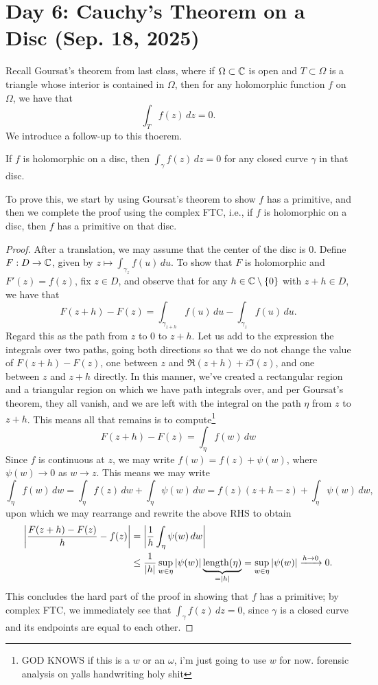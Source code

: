 \section{Day 6: Cauchy's Theorem on a Disc (Sep. 18, 2025)}
Recall Goursat's theorem from last class, where if $\Omega \subset \mathbb C$ is open and $T \subset \Omega$ is a triangle whose interior is contained in $\Omega$, then for any holomorphic function $f$ on $\Omega$, we have that
\[ \int_T f(z) \, dz = 0. \]
We introduce a follow-up to this thoerem.
\begin{theorem}
    If $f$ is holomorphic on a disc, then $\int_\gamma f(z) \, dz = 0$ for any closed curve $\gamma$ in that disc.
\end{theorem}
\noindent To prove this, we start by using Goursat's theorem to show $f$ has a primitive, and then we complete the proof using the complex FTC, i.e., if $f$ is holomorphic on a disc, then $f$ has a primitive on that disc.
\begin{proof}
    After a translation, we may assume that the center of the disc is $0$. Define $F : D \to \mathbb C$, given by $z \mapsto \int_{\gamma_z} f(u) \, du$. To show that $F$ is holomorphic and $F'(z) = f(z)$, fix $z \in D$, and observe that for any $h \in \mathbb C \setminus \{0\}$ with $z + h \in D$, we have that
    \[ F(z+h) - F(z) = \int_{\gamma_{z+h}} f(u) \, du - \int_{\gamma_z} f(u) \, du. \]
    Regard this as the path from $z$ to $0$ to $z+h$. Let us add to the expression the integrals over two paths, going both directions so that we do not change the value of $F(z+h) - F(z)$, one between $z$ and $\Re(z+h) + i \Im(z)$, and one between $z$ and $z+h$ directly. In this manner, we've created a rectangular region and a triangular region on which we have path integrals over, and per Goursat's theorem, they all vanish, and we are left with the integral on the path $\eta$ from $z$ to $z+h$. This means all that remains is to compute\footnote{GOD KNOWS if this is a $w$ or an $\omega$, i'm just going to use $w$ for now. forensic analysis on yalls handwriting holy shit}
    \[ F(z + h) - F(z) = \int_{\eta} f(w) \, dw \]
    Since $f$ is continuous at $z$, we may write $f(w) = f(z) + \psi(w)$, where $\psi(w) \to 0$ as $w \to z$. This means we may write
    \[ \int_\eta f(w) \, dw = \int_\eta f(z) \, dw + \int_\eta \psi(w) \, dw = f(z)(z+h - z) + \int_\eta \psi(w) \, dw, \]
    upon which we may rearrange and rewrite the above RHS to obtain
    \begin{align*}
        \left\lvert \frac{F(z+h) - F(z)}{h} - f(z) \right\rvert &= \left\lvert \frac{1}{h} \int_\eta \psi(w) \, dw \right\rvert \\
        &\leq \frac{1}{\left\lvert h \right\rvert} \sup_{w \in \eta} \left\lvert \psi(w) \right\rvert \underbrace{\operatorname{length}(\eta)}_{=\left\lvert h \right\rvert} = \sup_{w \in \eta} \left\lvert \psi(w) \right\rvert \xrightarrow{h \to 0} 0.
    \end{align*}
    This concludes the hard part of the proof in showing that $f$ has a primitive; by complex FTC, we immediately see that $\int_\gamma f(z) \, dz = 0$, since $\gamma$ is a closed curve and its endpoints are equal to each other.
\end{proof}

